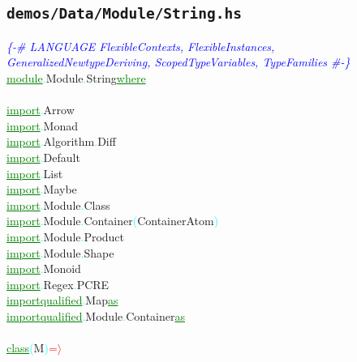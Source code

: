 \subsection{\texttt{demos/Data/Module/String.hs}}
\label{mod:Data.Module.String}
\textcolor{blue}{{\it{}\{-\# LANGUAGE FlexibleContexts, FlexibleInstances, GeneralizedNewtypeDeriving, ScopedTypeVariables, TypeFamilies \#-\}}}\\\textcolor{green}{\underline{module}}\textcolor{cyan}{.}{\rm{}Module}\textcolor{cyan}{.}{\rm{}String}\hsspace \textcolor{green}{\underline{where}}\\\\\textcolor{green}{\underline{import}}\textcolor{cyan}{.}{\rm{}Arrow}\\\textcolor{green}{\underline{import}}\textcolor{cyan}{.}{\rm{}Monad}\\\textcolor{green}{\underline{import}}\textcolor{cyan}{.}{\rm{}Algorithm}\textcolor{cyan}{.}{\rm{}Diff}\\\textcolor{green}{\underline{import}}\textcolor{cyan}{.}{\rm{}Default}\\\textcolor{green}{\underline{import}}\textcolor{cyan}{.}{\rm{}List}\\\textcolor{green}{\underline{import}}\textcolor{cyan}{.}{\rm{}Maybe}\\\textcolor{green}{\underline{import}}\textcolor{cyan}{.}{\rm{}Module}\textcolor{cyan}{.}{\rm{}Class}\\\textcolor{green}{\underline{import}}\textcolor{cyan}{.}{\rm{}Module}\textcolor{cyan}{.}{\rm{}Container}\hsspace \textcolor{cyan}{(}{\rm{}ContainerAtom}\textcolor{cyan}{)}\\\textcolor{green}{\underline{import}}\textcolor{cyan}{.}{\rm{}Module}\textcolor{cyan}{.}{\rm{}Product}\\\textcolor{green}{\underline{import}}\textcolor{cyan}{.}{\rm{}Module}\textcolor{cyan}{.}{\rm{}Shape}\\\textcolor{green}{\underline{import}}\textcolor{cyan}{.}{\rm{}Monoid}\\\textcolor{green}{\underline{import}}\textcolor{cyan}{.}{\rm{}Regex}\textcolor{cyan}{.}{\rm{}PCRE}\\\textcolor{green}{\underline{import}}\hsspace \textcolor{green}{\underline{qualified}}\textcolor{cyan}{.}{\rm{}Map}\hsspace \textcolor{green}{\underline{as}}\\\textcolor{green}{\underline{import}}\hsspace \textcolor{green}{\underline{qualified}}\textcolor{cyan}{.}{\rm{}Module}\textcolor{cyan}{.}{\rm{}Container}\hsspace \textcolor{green}{\underline{as}}\\\\\textcolor{green}{\underline{class}}\hsspace \textcolor{cyan}{(}{\rm{}M}\textcolor{cyan}{)}\hsspace \textcolor{red}{=\ensuremath{\rangle}}\hsspace 